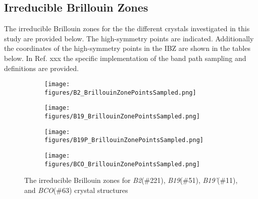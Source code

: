\documentclass[preprint,colorlinks=true,linkcolor=black,citecolor=black]{elsarticle}
\begin{document}

\subsection{Irreducible Brillouin Zones}
\label{sec:appx_ibz}

The irreducible Brillouin zones for the the different crystals investigated in this study are provided below. The high-symmetry points are indicated. Additionally the coordinates of the high-symmetry points in the IBZ are shown in the tables below. In Ref. xxx the  specific implementation of the band path sampling and definitions are provided.


\begin{figure}[!htp]
  \centering
  \begin{subfigure}[b]{0.45\linewidth}
      \texttt{[image: figures/B2\_BrillouinZonePointsSampled.png]}
      \caption{}
      \label{fig:B2}
  \end{subfigure}
  \hfill
  \begin{subfigure}[b]{0.45\linewidth}
      \texttt{[image: figures/B19\_BrillouinZonePointsSampled.png]}
      \caption{}
      \label{fig:B19}
  \end{subfigure}
  \vspace{1mm}
  \begin{subfigure}[b]{0.45\linewidth}
      \texttt{[image: figures/B19P\_BrillouinZonePointsSampled.png]}
      \caption{}
      \label{fig:B19P}
  \end{subfigure}
  \hfill
  \begin{subfigure}[b]{0.45\linewidth}
      \texttt{[image: figures/BCO\_BrillouinZonePointsSampled.png]}
      \caption{}
      \label{fig:BCO}
  \end{subfigure}
  \caption{The irreducible Brillouin zones for \textit{B2}(\#221), \textit{B19}(\#51), \textit{B19'}(\#11), and \textit{BCO}(\#63) crystal structures}
  \label{fig:ibz}
\end{figure}

\pagebreak

\end{document}
